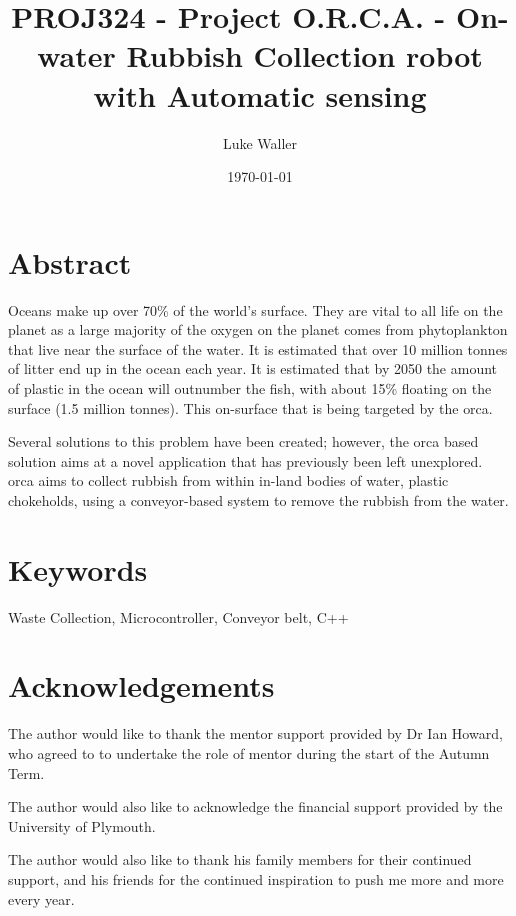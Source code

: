 \documentclass [11pt]{article}
\begin{document}
							
\title{\bf PROJ324 - Project O.R.C.A. - On-water Rubbish Collection robot with Automatic sensing} 	
\author{Luke Waller} 								
\date{\today} 										
\maketitle
\thispagestyle{empty}


\newpage 	

\section*{Abstract}

Oceans make up over 70\% of the world’s surface. They are vital to all life on the planet as a large majority of the oxygen on the planet comes from phytoplankton that live near the surface of the water. It is estimated that over 10 million tonnes of litter end up in the ocean each year. It is estimated that by 2050 the amount of plastic in the ocean will outnumber the fish, with about 15\% floating on the surface (1.5 million tonnes). This on-surface that is being targeted by the \gls{orca}.

Several solutions to this problem have been created; however, the \gls{orca} based solution aims at a novel application that has previously been left unexplored. \gls{orca} aims to collect rubbish from within in-land bodies of water, plastic chokeholds, using a conveyor-based system to remove the rubbish from the water.

\section*{Keywords} 
Waste Collection, Microcontroller, Conveyor belt, C++

\newpage
\section*{Acknowledgements}

The author would like to thank the mentor support provided by Dr Ian Howard, who agreed to to undertake the role of mentor during the start of the Autumn Term.

The author would also like to acknowledge the financial support provided by the University of Plymouth. 

The author would also like to thank his family members for their continued support, and his friends for the continued inspiration to push me more and more every year.
\end{document}
